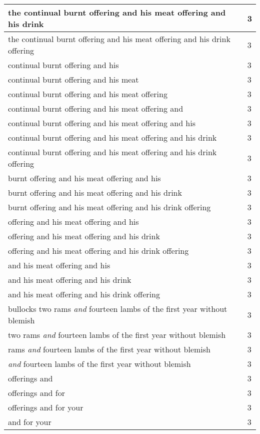 \begin{center}
\begin{longtable}{|p{3.0in}|p{0.5in}|}
the continual burnt offering and his meat offering and his drink & 3\\ \hline 
the continual burnt offering and his meat offering and his drink offering & 3\\ \hline 
continual burnt offering and his & 3\\ \hline 
continual burnt offering and his meat & 3\\ \hline 
continual burnt offering and his meat offering & 3\\ \hline 
continual burnt offering and his meat offering and & 3\\ \hline 
continual burnt offering and his meat offering and his & 3\\ \hline 
continual burnt offering and his meat offering and his drink & 3\\ \hline 
continual burnt offering and his meat offering and his drink offering & 3\\ \hline 
burnt offering and his meat offering and his & 3\\ \hline 
burnt offering and his meat offering and his drink & 3\\ \hline 
burnt offering and his meat offering and his drink offering & 3\\ \hline 
offering and his meat offering and his & 3\\ \hline 
offering and his meat offering and his drink & 3\\ \hline 
offering and his meat offering and his drink offering & 3\\ \hline 
and his meat offering and his & 3\\ \hline 
and his meat offering and his drink & 3\\ \hline 
and his meat offering and his drink offering & 3\\ \hline 
bullocks two rams \emph{and} fourteen lambs of the first year without blemish & 3\\ \hline 
two rams \emph{and} fourteen lambs of the first year without blemish & 3\\ \hline 
rams \emph{and} fourteen lambs of the first year without blemish & 3\\ \hline 
\emph{and} fourteen lambs of the first year without blemish & 3\\ \hline 
offerings and & 3\\ \hline 
offerings and for & 3\\ \hline 
offerings and for your & 3\\ \hline 
and for your & 3\\ \hline 
\end{longtable}
\end{center}





